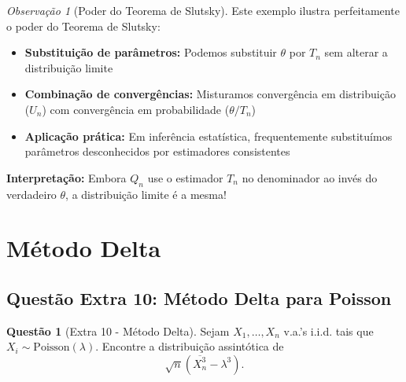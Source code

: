 \documentclass[12pt,a4paper]{article}
\theoremstyle{definition}
\newtheorem{questao}{Questão}[section]
\theoremstyle{remark}
\newtheorem{observacao}{Observação}[section]
\begin{document}
\begin{observacao}[Poder do Teorema de Slutsky]
Este exemplo ilustra perfeitamente o poder do Teorema de Slutsky:
\begin{itemize}
    \item \textbf{Substituição de parâmetros:} Podemos substituir $\theta$ por $T_n$ sem alterar a distribuição limite
    \item \textbf{Combinação de convergências:} Misturamos convergência em distribuição ($U_n$) com convergência em probabilidade ($\theta/T_n$)
    \item \textbf{Aplicação prática:} Em inferência estatística, frequentemente substituímos parâmetros desconhecidos por estimadores consistentes
\end{itemize}

\textbf{Interpretação:} Embora $Q_n$ use o estimador $T_n$ no denominador ao invés do verdadeiro $\theta$, a distribuição limite é a mesma!
\end{observacao}

\section{Método Delta}

\subsection{Questão Extra 10: Método Delta para Poisson}

\begin{questao}[Extra 10 - Método Delta]
Sejam $X_1, \ldots, X_n$ v.a.'s i.i.d. tais que $X_i \sim \text{Poisson}(\lambda)$. Encontre a distribuição assintótica de 
\[
\sqrt{n} \left( \overline{X_n^3} - \lambda^3 \right).
\]
\end{questao}
\end{document}
